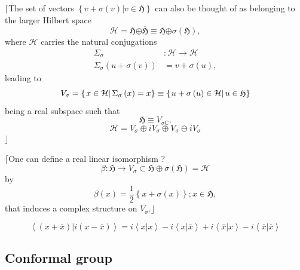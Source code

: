 \documentclass[aps,preprint]{revtex4}
\begin{document}
$\lceil$The set of vectors $\left\{ \left. v+\sigma\left( v\right)
\right\vert v\in\mathfrak{H}\right\} $ can also be thought of as belonging
to the larger Hilbert space 
\begin{equation}
\mathcal{H}=\mathfrak{H}\mathcal{\oplus}\overline{\mathfrak{H}}\equiv 
\mathfrak{H}\mathcal{\oplus\sigma}\left( \mathfrak{H}\right) ,
\end{equation}
where $\mathcal{H}$ carries the natural conjugations 
\begin{align}
\Sigma_{\sigma} & :\mathcal{H}\rightarrow\mathcal{H} \\
\Sigma_{\sigma}\left( u+\sigma\left( v\right) \right) & =v+\sigma\left(
u\right) ,
\end{align}
leading to%
\begin{equation}
V_{\sigma}=\left\{ \left. x\in\mathcal{H}\right\vert \Sigma_{\sigma}\left(
x\right) =x\right\} \equiv\left\{ \left. u+\sigma\left( u\right) \in\mathcal{%
H}\right\vert u\in\mathfrak{H}\right\}
\end{equation}
being a real subspace such that 
\begin{equation}
\mathfrak{H}\equiv V_{\sigma\mathbb{C}}.
\end{equation}%
\begin{equation}
\mathcal{H}=V_{\sigma}\oplus iV_{\sigma}\oplus V_{\sigma}\ominus iV_{\sigma}
\end{equation}
$\rfloor$

$\lceil$One can define a real linear isomorphism ? 
\begin{equation}
\beta:\mathfrak{H}\rightarrow V_{\sigma}\subset\mathfrak{H\oplus}%
\sigma\left( \mathfrak{H}\right) =\mathcal{H}
\end{equation}
by%
\begin{equation}
\beta\left( x\right) =\frac{1}{2}\left\{ x+\sigma\left( x\right) \right\}
;x\in\mathfrak{H,}
\end{equation}
that induces a complex structure on $V_{\sigma}$.$\rfloor$

\begin{equation}
\left\langle \left. \left( x+\overline{x}\right) \right\vert i\left( x-%
\overline{x}\right) \right\rangle =i\left\langle \left. x\right\vert
x\right\rangle -i\left\langle \left. x\right\vert \overline{x}\right\rangle
+i\left\langle \left. \overline{x}\right\vert x\right\rangle -i\left\langle
\left. \overline{x}\right\vert \overline{x}\right\rangle
\end{equation}

\subsection{Conformal group}
\end{document}

